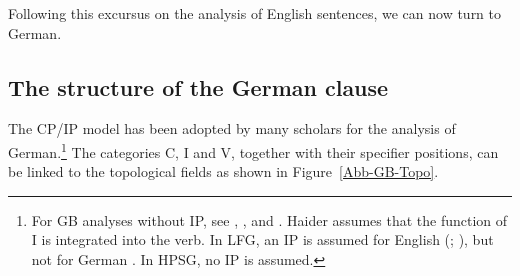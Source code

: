 Following this excursus on the analysis of English sentences, we can now turn to German.



\subsection{The structure of the German clause}
\label{sec-German-clause}

The CP/IP model has been adopted by many scholars for the analysis of German.\footnote{
  For GB analyses without IP, see , ,
   and . Haider assumes
  that the function of I is integrated into the verb. In LFG\indexlfg, an IP is assumed for English
  (\citealp[Section~6.2]{Bresnan2001a}; \citealp[Section~3.2.1]{Dalrymple2001a-u}), but not for German \citep[Section~3.2.3.2]{Berman2003a}.
  In HPSG\indexhpsg, no IP is assumed.
} 
The categories C, I and V, together with their specifier positions, can be linked to the
topological fields as shown in Figure~\vref{Abb-GB-Topo}.

